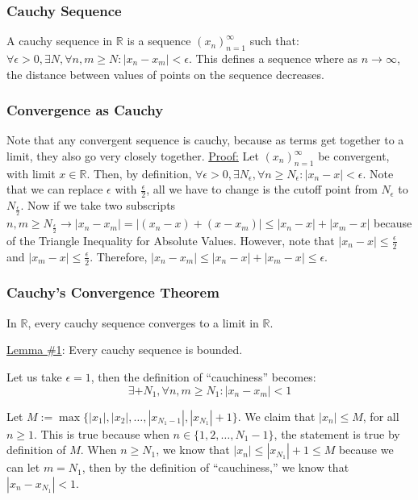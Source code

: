 \documentclass[11 pt, twoside]{article}
\begin{document}
\subsubsection{Cauchy Sequence}
A cauchy sequence in $\mathbb{R}$ is a sequence $(x_n)^\infty_{n=1}$ such that: $\forall \epsilon > 0, \exists N, \forall n, m \geq N: |x_n - x_m| < \epsilon$. This defines a sequence where as $n \to \infty$, the distance between values of points on the sequence decreases.

\subsubsection{Convergence as Cauchy}
Note that any convergent sequence is cauchy, because as terms get together
to a limit, they also go very closely together.
\underline{Proof:} Let $(x_n)_{n = 1}^\infty$ be convergent, with limit $x \in \mathbb{R}$.
Then, by definition, $\forall \epsilon > 0, \exists N_\epsilon, \forall
n \geq N_\epsilon :
|x_n - x| < \epsilon$. Note that we can replace $\epsilon$ with
$\frac{\epsilon}{2}$, all we have to change is the cutoff point from
$N_{\epsilon}$ to $N_{\frac{\epsilon}{2}}$. Now if we take two subscripts
$n, m \geq N_{\frac{\epsilon}{2}} \longrightarrow |x_n - x_m| = |(x_n - x) + (x - x_m)| \leq |x_n - x| + |x_m - x|$ because of the Triangle Inequality for Absolute Values. However, note that $|x_n - x| \leq \frac{\epsilon}{2}$ and $|x_m - x| \leq \frac{\epsilon}{2}$.
Therefore, $|x_n - x_m| \leq |x_n - x| + |x_m - x| \leq \epsilon$.

\subsubsection{Cauchy's Convergence Theorem}

In $\mathbb{R}$, every cauchy sequence converges to a limit in $\mathbb{R}$.
\par \underline{Lemma \#1}: Every cauchy sequence is bounded.

Let us take $\epsilon = 1$, then the definition of ``cauchiness'' becomes:
$$\exists+ N_1, \forall n, m \geq N_1 : |x_n - x_m| < 1$$

Let $M := \max\{|x_1|, |x_2|, \dots, |x_{N_1 - 1}|, |x_{N_1}| + 1\}$. We claim
that $|x_n| \leq M$, for all $n \geq 1$. This is true because when $n \in \{1, 2, \dots, N_1
- 1\}$, the statement is true by definition of $M$. When $n \geq N_1$, we know
that $|x_n| \leq |x_{N_1}| + 1 \leq M$ because we can let $m = N_1$, then by the
definition of ``cauchiness,'' we know that $|x_n - x_{N_1}| < 1$.
\end{document}
